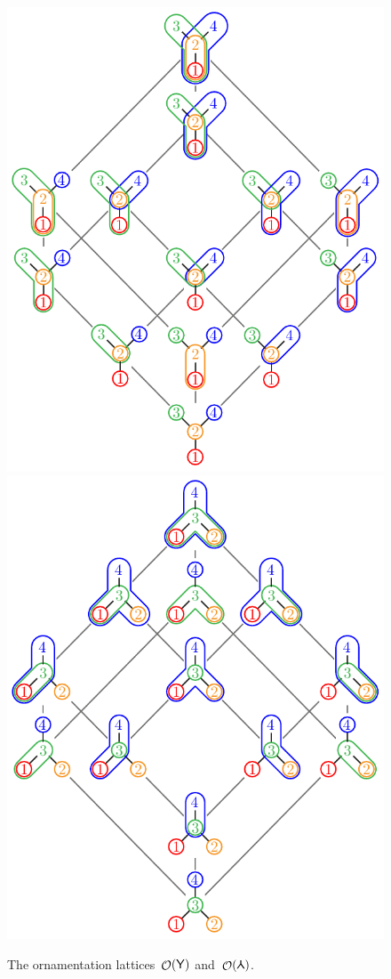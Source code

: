 \documentclass{amsart}
\theoremstyle{definition}
\renewcommand{\c}[1]{\mathcal{#1}} %
\DeclareMathOperator{\Orn}{\c{O}}  %
\newcommand{\Ygraph}{\sf Y} %
\newcommand{\Agraph}{\rotatebox[origin=c]{180}{\sf Y}} %
\begin{document}
\begin{figure}
	\centerline{\includegraphics[scale=.8]{ornamentationsY} \qquad \includegraphics[scale=.8]{ornamentationsA}}
	\caption{The ornamentation lattices~$\Orn(\Ygraph)$ and~$\Orn(\Agraph)$.}
	\label{fig:ornamentationsAY}
\end{figure}
\end{document}
